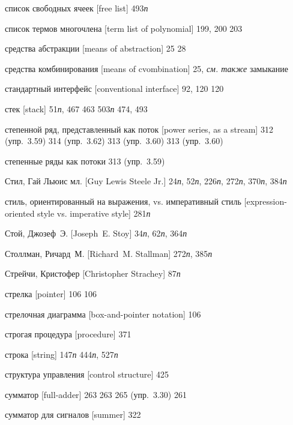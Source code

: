 \begin{theindex}
\item {список свободных ячеек [free list]} 493{\it п}
\item {список термов многочлена [term list of polynomial]} 199, 200
   203
\item {средства абстракции [means of abstraction]} 25
   28
\item {средства комбинирования [means of cvombination]} 25, {\it см. также} замыкание
\item {стандартный интерфейс [conventional interface]} 92, 120
   120
\item {стек [stack]} 51{\it п}, 467
   463
   503{\it п}
   474, 493
\item {степенной ряд, представленный как поток [power series, as a stream]} 312 (упр.~3.59)
   314 (упр.~3.62)
   313 (упр.~3.60)
   313 (упр.~3.60)
\item {степенные ряды как потоки}
   313 (упр.~3.59)
\item {Стил, Гай Льюис мл. [Guy Lewis Steele Jr.]} 24{\it п}, 52{\it п}, 226{\it п}, 272{\it п}, 370{\it п}, 384{\it п}
\item {стиль, ориентированный на выражения, vs. императивный стиль [expression-oriented style vs. imperative style]} 281{\it п}
\item {Стой, Джозеф~Э. [Joseph~E. Stoy]} 34{\it п}, 62{\it п}, 364{\it п}
\item {Столлман, Ричард~М. [Richard~M. Stallman]} 272{\it п}, 385{\it п}
\item {Стрейчи, Кристофер [Christopher Strachey]} 87{\it п}
\item {стрелка [pointer]} 106
   106
\item {стрелочная диаграмма [box-and-pointer notation]} 106
\item {строгая процедура [procedure]} 371
\item {строка [string]}
   147{\it п}
   444{\it п}, 527{\it п}
\item {структура управления [control structure]} 425
\item {сумматор [full-adder]} 263
   263
   265 (упр.~3.30)
   261
\item {сумматор для сигналов [summer]} 322

\end{theindex}
